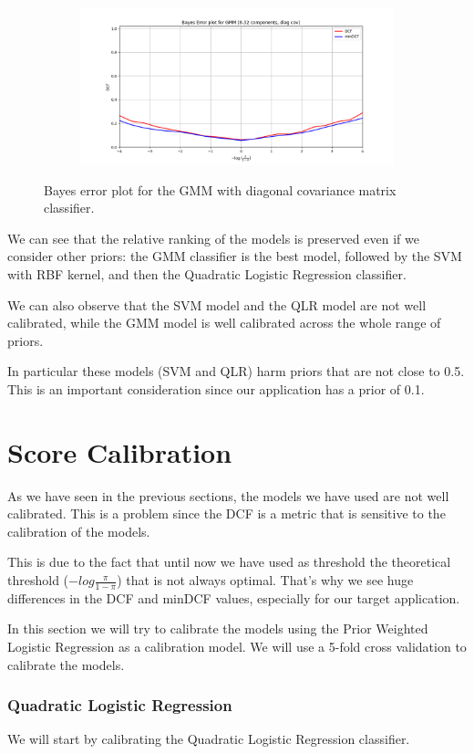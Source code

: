 \documentclass[12pt]{report}
\newcommand{\nnl}{%
    \newline
    \newline
}
\newcommand{\nl}{%
    \newline
    \noindent
}
\begin{document}
\begin{figure}[H]
    \centering
    \begin{subfigure}[t]{0.6\textwidth}
        \includegraphics[width=\textwidth]{./plot/model_selection/GMM.png}
    \end{subfigure}
    \caption{Bayes error plot for the GMM with diagonal covariance matrix classifier.}
    \label{fig:bayes_error_GMM}
\end{figure}
\noindent
We can see that the relative ranking of the models is preserved even if we consider other priors: the GMM classifier is the best model, followed by the SVM with RBF kernel, and then the Quadratic Logistic Regression classifier.
\nnl
We can also observe that the SVM model and the QLR model are not well calibrated, while the GMM model is well calibrated across the whole range of priors.
\nl
In particular these models (SVM and QLR) harm priors that are not close to 0.5. This is an important consideration since our application has a prior of 0.1.

\section{Score Calibration}
As we have seen in the previous sections, the models we have used are not well calibrated. This is a problem since the DCF is a metric that is sensitive to the calibration of the models.
\nl
This is due to the fact that until now we have used as threshold the theoretical threshold ($-{log}\frac{\pi}{1-\pi}$) that is not always optimal. That's why we see huge differences in the DCF and minDCF values, especially for our target application.
\nnl
In this section we will try to calibrate the models using the Prior Weighted Logistic Regression as a calibration model. We will use a 5-fold cross validation to calibrate the models.
\subsubsection*{Quadratic Logistic Regression}
We will start by calibrating the Quadratic Logistic Regression classifier.
\end{document}
